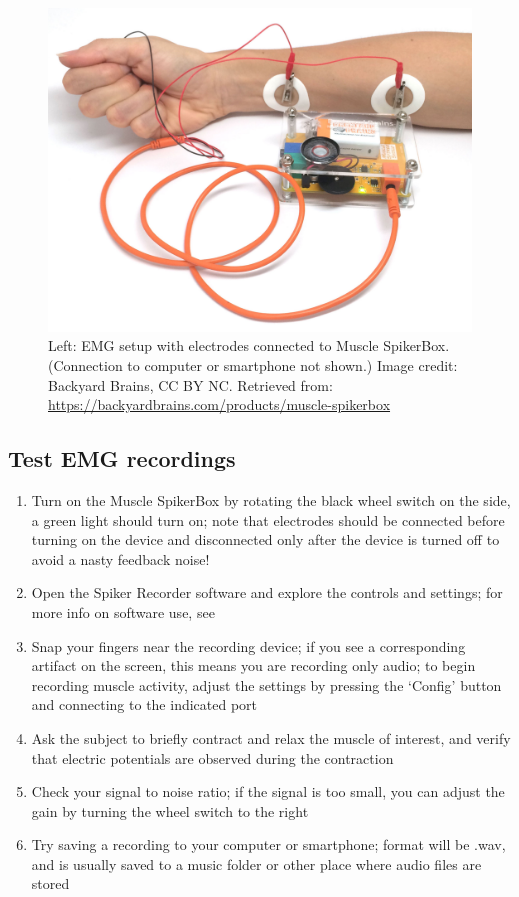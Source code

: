 \documentclass{article}
\begin{document}
\begin{figure}[!htbp]
\centering
\includegraphics[width=0.6\linewidth]{files/EPpXta8zJdzN048lz8AR-e331cbce7ea092befb5c4333b822fbab.jpeg}
\caption[]{Left: EMG setup with electrodes connected to Muscle SpikerBox. (Connection to computer or smartphone not shown.) Image credit: Backyard Brains, CC BY NC. Retrieved from: \href{https://backyardbrains.com/products/muscle-spikerbox}{https://backyardbrains.com/products/muscle-spikerbox}}
\label{vd6nQSgThG}
\end{figure}

\subsection{Test EMG recordings}

\begin{enumerate}
\item Turn on the Muscle SpikerBox by rotating the black wheel switch on the side, a green light should turn on; note that electrodes should be connected before turning on the device and disconnected only after the device is turned off to avoid a nasty feedback noise!
\item Open the Spiker Recorder software and explore the controls and settings; for more info on software use, see \citet{spikeRecorder}
\item Snap your fingers near the recording device; if you see a corresponding artifact on the screen, this means you are recording only audio; to begin recording muscle activity, adjust the settings by pressing the `Config' button and connecting to the indicated port
\item Ask the subject to briefly contract and relax the muscle of interest, and verify that electric potentials are observed during the contraction
\item Check your signal to noise ratio; if the signal is too small, you can adjust the gain by turning the wheel switch to the right
\item Try saving a recording to your computer or smartphone; format will be .wav, and is usually saved to a music folder or other place where audio files are stored
\end{enumerate}
\end{document}
